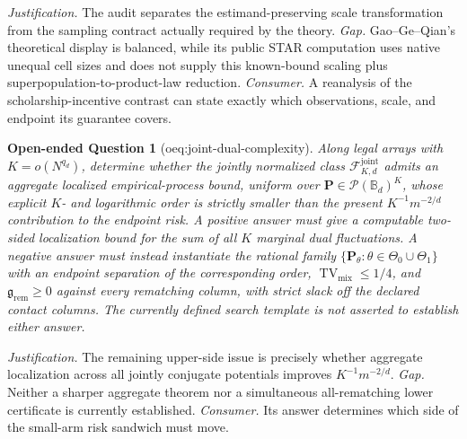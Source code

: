\documentclass{article}
\newtheorem{openendedquestion}{Open-ended Question}
\begin{document}
\par\smallskip\noindent \textit{Justification.} The audit separates the estimand-preserving scale transformation from the sampling contract actually required by the theory. \textit{Gap.} Gao--Ge--Qian's theoretical display is balanced, while its public STAR computation uses native unequal cell sizes and does not supply this known-bound scaling plus superpopulation-to-product-law reduction. \textit{Consumer.} A reanalysis of the scholarship-incentive contrast can state exactly which observations, scale, and endpoint its guarantee covers.

\begin{openendedquestion}[oeq:joint-dual-complexity]\label{oeq:joint-dual-complexity}
Along legal arrays with \(K=o(N^{q_d})\), determine whether the jointly normalized class \(\mathcal F_{K,d}^{\mathrm{joint}}\) admits an aggregate localized empirical-process bound, uniform over \(\mathbf P\in\mathcal P(\mathbb B_d)^K\), whose explicit \(K\)- and logarithmic order is strictly smaller than the present \(K^{-1}m^{-2/d}\) contribution to the endpoint risk. A positive answer must give a computable two-sided localization bound for the sum of all \(K\) marginal dual fluctuations. A negative answer must instead instantiate the rational family \(\{\mathbf P_\theta:\theta\in\Theta_0\cup\Theta_1\}\) with an endpoint separation of the corresponding order, \(\operatorname{TV}_{\mathrm{mix}}\le1/4\), and \(\mathfrak g_{\mathrm{rem}}\ge0\) against every rematching column, with strict slack off the declared contact columns. The currently defined search template is not asserted to establish either answer.
\end{openendedquestion}
\par\smallskip\noindent \textit{Justification.} The remaining upper-side issue is precisely whether aggregate localization across all jointly conjugate potentials improves \(K^{-1}m^{-2/d}\). \textit{Gap.} Neither a sharper aggregate theorem nor a simultaneous all-rematching lower certificate is currently established. \textit{Consumer.} Its answer determines which side of the small-arm risk sandwich must move.
\end{document}
